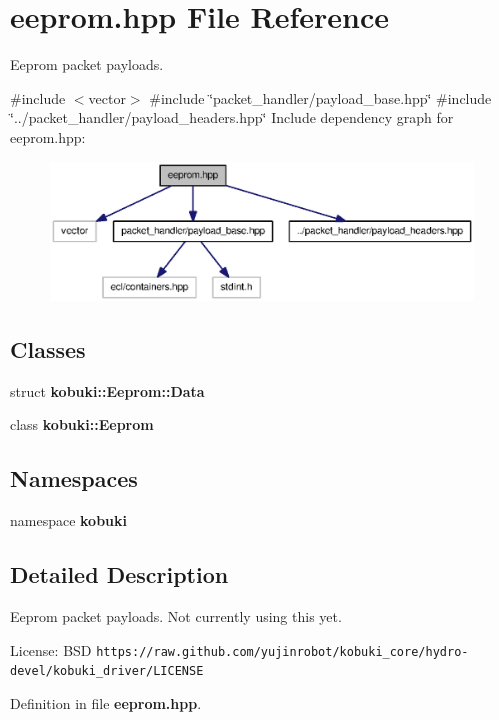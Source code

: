 \section{eeprom.\-hpp \-File \-Reference}
\label{eeprom_8hpp}


\-Eeprom packet payloads.  


{\ttfamily \#include $<$vector$>$}\*
{\ttfamily \#include \char`\"{}packet\-\_\-handler/payload\-\_\-base.\-hpp\char`\"{}}\*
{\ttfamily \#include \char`\"{}../packet\-\_\-handler/payload\-\_\-headers.\-hpp\char`\"{}}\*
\-Include dependency graph for eeprom.\-hpp\-:
\nopagebreak
\begin{figure}[H]
\begin{center}
\leavevmode
\includegraphics[width=350pt]{eeprom_8hpp__incl}
\end{center}
\end{figure}
\subsection*{\-Classes}
\begin{DoxyCompactItemize}
\item 
struct {\bf kobuki\-::\-Eeprom\-::\-Data}
\item 
class {\bf kobuki\-::\-Eeprom}
\end{DoxyCompactItemize}
\subsection*{\-Namespaces}
\begin{DoxyCompactItemize}
\item 
namespace {\bf kobuki}
\end{DoxyCompactItemize}


\subsection{\-Detailed \-Description}
\-Eeprom packet payloads. \-Not currently using this yet.

\-License\-: \-B\-S\-D {\tt https\-://raw.\-github.\-com/yujinrobot/kobuki\-\_\-core/hydro-\/devel/kobuki\-\_\-driver/\-L\-I\-C\-E\-N\-S\-E} 

\-Definition in file {\bf eeprom.\-hpp}.

